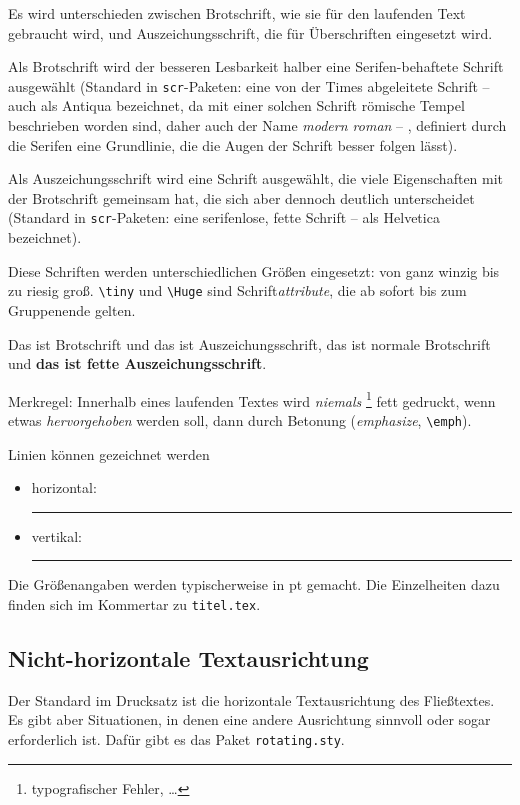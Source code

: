 Es wird unterschieden zwischen Brotschrift, wie sie für den laufenden Text
gebraucht wird, und Auszeichungsschrift, die für Überschriften eingesetzt
wird.

Als Brotschrift wird der besseren Lesbarkeit halber eine Serifen-behaftete
Schrift ausgewählt (Standard in \texttt{scr}-Paketen: eine von der Times
abgeleitete Schrift -- auch als Antiqua bezeichnet, da mit einer solchen
Schrift römische Tempel beschrieben worden sind, daher auch der Name
\textit{modern roman} -- , definiert durch die Serifen eine Grundlinie, die
die Augen der Schrift besser folgen lässt).

Als Auszeichungsschrift wird eine Schrift ausgewählt, die viele
Eigenschaften mit der Brotschrift gemeinsam hat, die sich aber dennoch
deutlich unterscheidet (Standard in \texttt{scr}-Paketen: eine serifenlose,
fette Schrift -- als Helvetica bezeichnet).

Diese Schriften werden unterschiedlichen Größen eingesetzt: von {\tiny ganz
  winzig} bis zu {\Huge riesig groß}. \lstinline|\tiny|
und \lstinline|\Huge| sind Schrift\emph{attribute}, die ab sofort bis zum
Gruppenende gelten.

\textnormal{Das ist Brotschrift} und \textsf{das ist Auszeichungsschrift},
\textnormal{das ist normale Brotschrift} und \textsf{\bfseries das ist
  fette Auszeichungsschrift}.

Merkregel: Innerhalb eines laufenden Textes wird \emph{niemals}%
\footnote{typografischer Fehler, \ldots} fett gedruckt, wenn etwas
\emph{hervorgehoben} werden soll, dann durch Betonung
(\textit{emphasize}, \lstinline|\emph|).

Linien können gezeichnet werden
\begin{itemize}
  \item horizontal: \rule{220pt}{2pt}
  \item vertikal: \rule{1pt}{22pt}
\end{itemize}
Die Größenangaben werden typischerweise in pt gemacht. Die Einzelheiten dazu
finden sich im Kommertar zu \texttt{titel.tex}.


\subsection{Nicht-horizontale Textausrichtung}

Der Standard im Drucksatz ist die horizontale Textausrichtung des Fließtextes.
Es gibt aber Situationen, in denen eine andere Ausrichtung sinnvoll oder sogar
erforderlich ist. Dafür gibt es das Paket \texttt{rotating.sty}.

